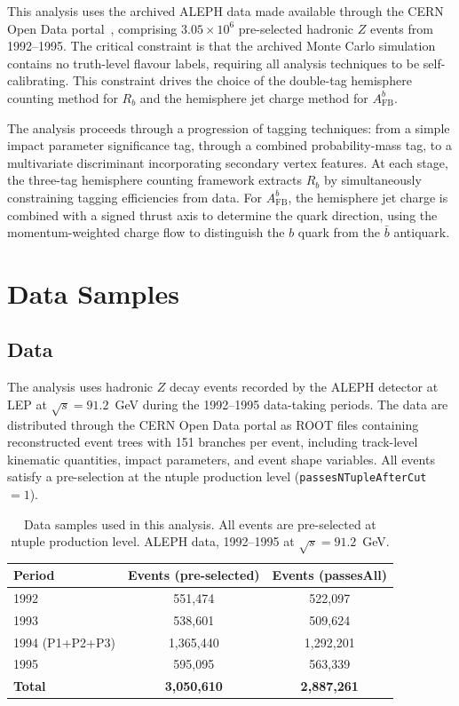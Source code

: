 \documentclass[11pt,a4paper]{article}
\begin{document}
This analysis uses the archived ALEPH data made available through the
CERN Open Data portal~\cite{ALEPH:opendata}, comprising $3.05 \times 10^6$
pre-selected hadronic $Z$ events from 1992--1995.  The critical constraint
is that the archived Monte Carlo simulation contains no truth-level flavour
labels, requiring all analysis techniques to be self-calibrating.  This
constraint drives the choice of the double-tag hemisphere counting method
for $R_b$ and the hemisphere jet charge method for $A_\mathrm{FB}^b$.

The analysis proceeds through a progression of tagging techniques: from
a simple impact parameter significance tag, through a combined
probability-mass tag, to a multivariate discriminant incorporating
secondary vertex features.  At each stage, the three-tag hemisphere
counting framework extracts $R_b$ by simultaneously constraining
tagging efficiencies from data.  For $A_\mathrm{FB}^b$, the
hemisphere jet charge is combined with a signed thrust axis to determine
the quark direction, using the momentum-weighted charge flow to
distinguish the $b$ quark from the $\bar{b}$ antiquark.

\section{Data Samples}
\label{sec:data}

\subsection{Data}

The analysis uses hadronic $Z$ decay events recorded by the ALEPH
detector at LEP at $\sqrt{s} = 91.2$~GeV during the 1992--1995 data-taking
periods.  The data are distributed through the CERN Open Data portal as
ROOT files containing reconstructed event trees with 151 branches per
event, including track-level kinematic quantities, impact parameters,
and event shape variables.  All events satisfy a pre-selection at the
ntuple production level (\texttt{passesNTupleAfterCut}~$= 1$).

\begin{table}[htbp]
\centering
\caption{Data samples used in this analysis.  All events are pre-selected
  at ntuple production level.  ALEPH data, 1992--1995 at
  $\sqrt{s} = 91.2$~GeV.}
\label{tbl:data}
\begin{tabular}{lcc}
\toprule
Period & Events (pre-selected) & Events (passesAll) \\
\midrule
1992              & 551,474   & 522,097   \\
1993              & 538,601   & 509,624   \\
1994 (P1+P2+P3)  & 1,365,440 & 1,292,201 \\
1995              & 595,095   & 563,339   \\
\midrule
\textbf{Total}    & \textbf{3,050,610} & \textbf{2,887,261} \\
\bottomrule
\end{tabular}
\end{table}
\end{document}
